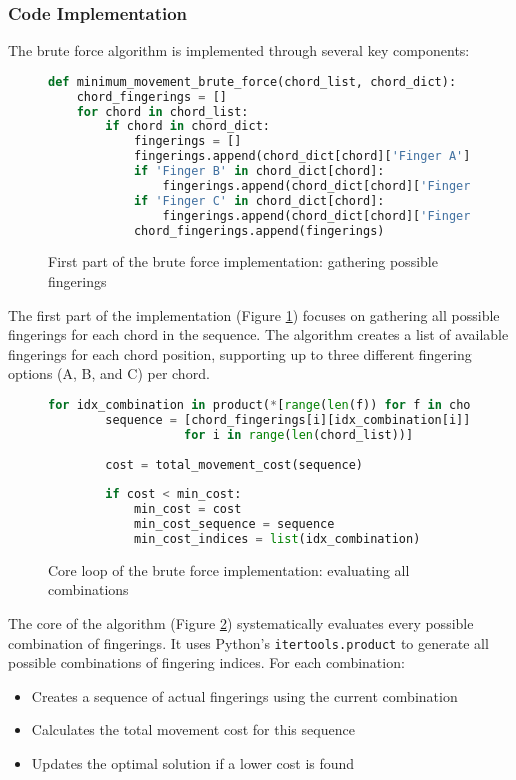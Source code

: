 \documentclass[conference]{IEEEtran}
\begin{document}
\subsubsection{Code Implementation}
The brute force algorithm is implemented through several key components:

\begin{figure}[H]
\begin{lstlisting}[language=Python]
def minimum_movement_brute_force(chord_list, chord_dict):
    chord_fingerings = []
    for chord in chord_list:
        if chord in chord_dict:
            fingerings = []
            fingerings.append(chord_dict[chord]['Finger A'])
            if 'Finger B' in chord_dict[chord]:
                fingerings.append(chord_dict[chord]['Finger B'])
            if 'Finger C' in chord_dict[chord]:
                fingerings.append(chord_dict[chord]['Finger C'])
            chord_fingerings.append(fingerings)
\end{lstlisting}
\caption{First part of the brute force implementation: gathering possible fingerings}
\label{fig:BruteForceGather}
\end{figure}

The first part of the implementation (Figure \ref{fig:BruteForceGather}) focuses on gathering all possible fingerings for each chord in the sequence. The algorithm creates a list of available fingerings for each chord position, supporting up to three different fingering options (A, B, and C) per chord.

\begin{figure}[H]
\begin{lstlisting}[language=Python]
    for idx_combination in product(*[range(len(f)) for f in chord_fingerings]):
        sequence = [chord_fingerings[i][idx_combination[i]] 
                   for i in range(len(chord_list))]
        
        cost = total_movement_cost(sequence)
        
        if cost < min_cost:
            min_cost = cost
            min_cost_sequence = sequence
            min_cost_indices = list(idx_combination)
\end{lstlisting}
\caption{Core loop of the brute force implementation: evaluating all combinations}
\label{fig:BruteForceCore}
\end{figure}

The core of the algorithm (Figure \ref{fig:BruteForceCore}) systematically evaluates every possible combination of fingerings. It uses Python's \lstinline{itertools.product} to generate all possible combinations of fingering indices. For each combination:
\begin{itemize}
    \item Creates a sequence of actual fingerings using the current combination
    \item Calculates the total movement cost for this sequence
    \item Updates the optimal solution if a lower cost is found
\end{itemize}
\end{document}
